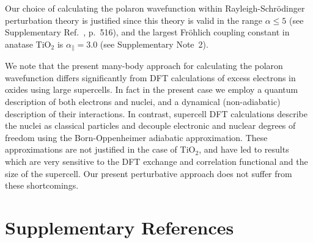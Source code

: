 \documentclass[12pt]{nature-mod}
\begin{document}
Our choice of calculating the polaron wavefunction within Rayleigh-Schr\"odinger perturbation theory 
is justified since this theory is valid in the range $\alpha \leq 5$ (see Supplementary 
Ref.~, p.~516), and the largest Fr\"ohlich coupling constant in anatase TiO$_2$ is 
$\alpha_\parallel = 3.0$ (see Supplementary Note~2).

We note that the present many-body approach for calculating the polaron wavefunction differs significantly
from DFT calculations of excess electrons in oxides using large 
supercells\cite{DiValentin2011, Deak2012, Setvin2014, Spreafico2014}.
In fact in the present case we employ a quantum description of both electrons and nuclei, and a 
dynamical (non-adiabatic) description of their interactions. In contrast, supercell DFT calculations
describe the nuclei as classical particles and decouple electronic and nuclear degrees of freedom
using the Born-Oppenheimer adiabatic approximation. These approximations are not justified in the
case of TiO$_2$, and have led to results which are very sensitive to the DFT exchange and correlation
functional and the size of the supercell. Our present perturbative approach does not suffer from these
shortcomings.

\clearpage

\section*{Supplementary References}

%
%
\end{document}
